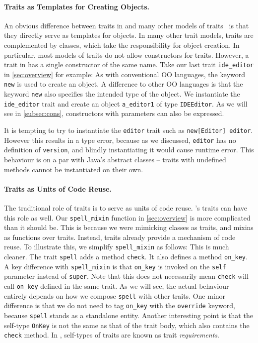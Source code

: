 \paragraph{Traits as Templates for Creating Objects.} An obvious difference between
traits in \name and many other models of
traits~\cite{scharli2003traits,fisher2004typed,odersky2005scalable} is that they
directly serve as templates for objects. In many other trait models, traits are
complemented by classes, which take the responsibility for object creation. In
particular, most models of traits do not allow constructors for traits. However,
a trait in \name has a single constructor of the same name. Take our last trait
\lstinline{ide_editor} in \cref{sec:overview} for example:
As with conventional OO languages, the keyword \lstinline{new} is used to create
an object. A difference to other OO languages is that the keyword
\lstinline{new} also specifies the intended type of the object. We
instantiate the \lstinline{ide_editor} trait and create an object
\lstinline{a_editor1} of type \lstinline{IDEEditor}. As we will see in
\cref{subsec:cons}, constructors with parameters can also be expressed.

It is tempting to try to instantiate the \lstinline{editor} trait such as
\lstinline{new[Editor] editor}. However this results in a type error, because as
we discussed, \lstinline{editor} has no definition of \lstinline{version}, and
blindly instantiating it would cause runtime error. This behaviour is on a par
with Java's abstract classes -- traits with undefined methods cannot be
instantiated on their own.

\paragraph{Traits as Units of Code Reuse.}
The traditional role of traits is to serve as units of code reuse. \name's traits
can have this role as well.
Our \lstinline{spell_mixin} function in \cref{sec:overview} is more complicated than it should be.
This is because we were mimicking classes as traits, and
mixins as functions over traits. Instead, traits already provide a mechanism of
code reuse. To illustrate this, we simplify \lstinline{spell_mixin} as follows:
This is much cleaner. The trait \lstinline{spell} adds a method
\lstinline{check}. It also defines a method \lstinline{on_key}.
A key difference with \lstinline{spell_mixin} is that \lstinline{on_key} is invoked on the \lstinline{self}
parameter instead of \lstinline{super}. Note that this does not necessarily mean \lstinline{check} will call \lstinline{on_key}
defined in the same trait. As we will see, the actual behaviour entirely depends on how we compose \lstinline{spell}
with other traits. One minor difference is that we do not need to tag \lstinline{on_key}
with the \lstinline{override} keyword, because \lstinline{spell} stands as a standalone entity.
Another interesting point is that the self-type \lstinline{OnKey}
is not the same as that of the trait body, which also contains the \lstinline{check} method.
In \name, self-types of traits are known as trait \emph{requirements}.


